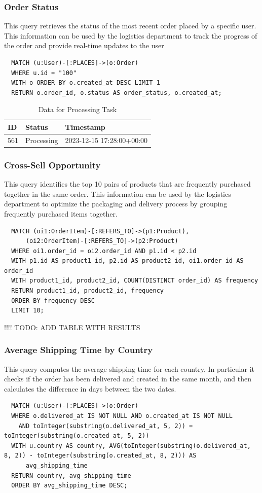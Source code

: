 \documentclass[a4paper,12pt]{article}
\begin{document}
\subsubsection{Order Status}
This query retrieves the status of the most recent order placed by a specific user. This information can be used by the logistics department to track the progress of the order and provide real-time updates to the user
\begin{verbatim}
  MATCH (u:User)-[:PLACES]->(o:Order)
  WHERE u.id = "100"
  WITH o ORDER BY o.created_at DESC LIMIT 1
  RETURN o.order_id, o.status AS order_status, o.created_at;
\end{verbatim}
\begin{table}[h!]
  \centering
  \caption{Data for Processing Task}
  \label{tab:processing_data}
  \begin{tabular}{l l l}
      \toprule
      \textbf{ID} & \textbf{Status} & \textbf{Timestamp} \\
      \midrule
      561 & Processing & 2023-12-15 17:28:00+00:00 \\
      \bottomrule
  \end{tabular}
\end{table}

\subsubsection{Cross-Sell Opportunity}
This query identifies the top 10 pairs of products that are frequently purchased together in the same order. This information can be used by the logistics department to optimize the packaging and delivery process by grouping frequently purchased items together.
\begin{verbatim}
  MATCH (oi1:OrderItem)-[:REFERS_TO]->(p1:Product),
      (oi2:OrderItem)-[:REFERS_TO]->(p2:Product)
  WHERE oi1.order_id = oi2.order_id AND p1.id < p2.id  
  WITH p1.id AS product1_id, p2.id AS product2_id, oi1.order_id AS order_id
  WITH product1_id, product2_id, COUNT(DISTINCT order_id) AS frequency
  RETURN product1_id, product2_id, frequency
  ORDER BY frequency DESC
  LIMIT 10;
\end{verbatim}

!!!! TODO: ADD TABLE WITH RESULTS

\subsubsection{Average Shipping Time by Country}
This query computes the average shipping time for each country.
In particular it checks if the order has been delivered and created in the same month, and then calculates the difference in days between the two dates.
\begin{verbatim}
  MATCH (u:User)-[:PLACES]->(o:Order)
  WHERE o.delivered_at IS NOT NULL AND o.created_at IS NOT NULL
    AND toInteger(substring(o.delivered_at, 5, 2)) = toInteger(substring(o.created_at, 5, 2))
  WITH u.country AS country, AVG(toInteger(substring(o.delivered_at, 8, 2)) - toInteger(substring(o.created_at, 8, 2))) AS
      avg_shipping_time
  RETURN country, avg_shipping_time
  ORDER BY avg_shipping_time DESC;
\end{verbatim}
\end{document}
